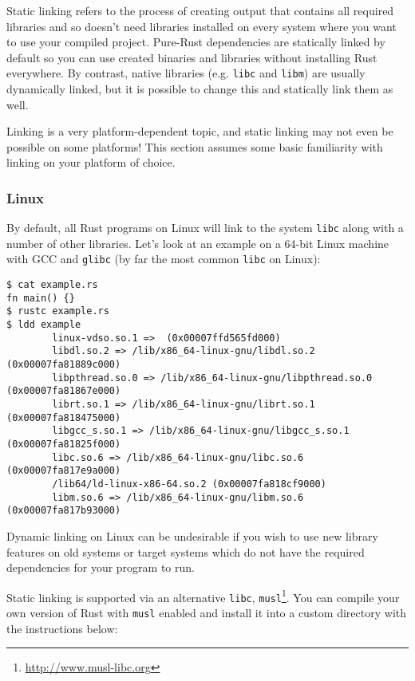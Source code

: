 \documentclass[a4paper,]{book}
\renewcommand{\href}[2]{#2\footnote{\url{#1}}}
\begin{document}
Static linking refers to the process of creating output that contains
all required libraries and so doesn't need libraries installed on every
system where you want to use your compiled project. Pure-Rust
dependencies are statically linked by default so you can use created
binaries and libraries without installing Rust everywhere. By contrast,
native libraries (e.g. \texttt{libc} and \texttt{libm}) are usually
dynamically linked, but it is possible to change this and statically
link them as well.

Linking is a very platform-dependent topic, and static linking may not
even be possible on some platforms! This section assumes some basic
familiarity with linking on your platform of choice.

\subsubsection{Linux}\label{linux}

By default, all Rust programs on Linux will link to the system
\texttt{libc} along with a number of other libraries. Let's look at an
example on a 64-bit Linux machine with GCC and \texttt{glibc} (by far
the most common \texttt{libc} on Linux):

\begin{verbatim}
$ cat example.rs
fn main() {}
$ rustc example.rs
$ ldd example
        linux-vdso.so.1 =>  (0x00007ffd565fd000)
        libdl.so.2 => /lib/x86_64-linux-gnu/libdl.so.2 (0x00007fa81889c000)
        libpthread.so.0 => /lib/x86_64-linux-gnu/libpthread.so.0 (0x00007fa81867e000)
        librt.so.1 => /lib/x86_64-linux-gnu/librt.so.1 (0x00007fa818475000)
        libgcc_s.so.1 => /lib/x86_64-linux-gnu/libgcc_s.so.1 (0x00007fa81825f000)
        libc.so.6 => /lib/x86_64-linux-gnu/libc.so.6 (0x00007fa817e9a000)
        /lib64/ld-linux-x86-64.so.2 (0x00007fa818cf9000)
        libm.so.6 => /lib/x86_64-linux-gnu/libm.so.6 (0x00007fa817b93000)
\end{verbatim}

Dynamic linking on Linux can be undesirable if you wish to use new
library features on old systems or target systems which do not have the
required dependencies for your program to run.

Static linking is supported via an alternative \texttt{libc},
\href{http://www.musl-libc.org}{\texttt{musl}}. You can compile your own
version of Rust with \texttt{musl} enabled and install it into a custom
directory with the instructions below:
\end{document}
